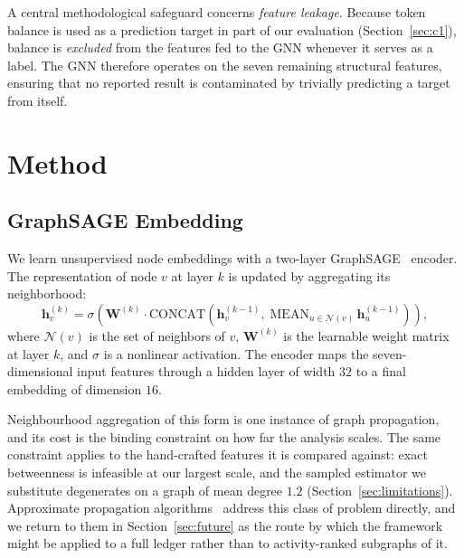 \documentclass[final,5p,times]{elsarticle}
\begin{document}
A central methodological safeguard concerns \emph{feature leakage}. Because
token balance is used as a prediction target in part of our evaluation
(Section~\ref{sec:c1}), balance is \emph{excluded} from the features fed to
the GNN whenever it serves as a label. The GNN therefore operates on the
seven remaining structural features, ensuring that no reported result is
contaminated by trivially predicting a target from itself.

\section{Method}
\label{sec:method}

\subsection{GraphSAGE Embedding}
\label{sec:sage}
We learn unsupervised node embeddings with a two-layer
GraphSAGE~\cite{hamilton2017inductive} encoder. The representation of node
$v$ at layer $k$ is updated by aggregating its neighborhood:
\begin{equation}
\label{eq:sage}
\mathbf{h}_v^{(k)} = \sigma\!\left(\mathbf{W}^{(k)} \cdot
\mathrm{CONCAT}\!\left(\mathbf{h}_v^{(k-1)},\;
\mathrm{MEAN}_{u \in \mathcal{N}(v)}\, \mathbf{h}_u^{(k-1)}\right)\right),
\end{equation}
where $\mathcal{N}(v)$ is the set of neighbors of $v$, $\mathbf{W}^{(k)}$ is
the learnable weight matrix at layer $k$, and $\sigma$ is a nonlinear
activation. The encoder maps the seven-dimensional input features through a
hidden layer of width $32$ to a final embedding of dimension $16$.

Neighbourhood aggregation of this form is one instance of graph propagation,
and its cost is the binding constraint on how far the analysis scales. The
same constraint applies to the hand-crafted features it is compared against:
exact betweenness is infeasible at our largest scale, and the sampled
estimator we substitute degenerates on a graph of mean degree $1.2$
(Section~\ref{sec:limitations}). Approximate propagation
algorithms~\cite{wang2021agp} address this class of problem directly, and we
return to them in Section~\ref{sec:future} as the route by which the
framework might be applied to a full ledger rather than to activity-ranked
subgraphs of it.
\end{document}
